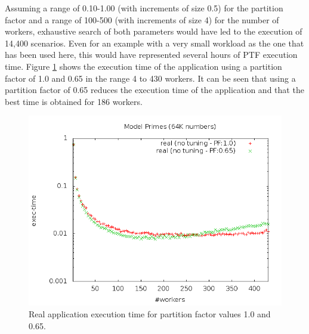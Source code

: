 Assuming a range of 0.10-1.00 (with increments of size 0.5) for the partition factor and a range of 100-500 (with increments of size 4) for the number of workers, exhaustive search of both parameters would have led to the execution of 14,400 scenarios. Even for an example with a very small workload as the one that has been used here, this would have represented several hours of PTF execution time. Figure \ref{fig:MWprimes-exhaustive} shows the execution time of the application using a partition factor of 1.0 and 0.65 in the range 4 to 430 workers. It can be seen that using a partition factor of 0.65 reduces the execution time of the application and that the best time is obtained for 186 workers.

\begin{figure}[bt]
  \center
  \includegraphics[width=0.55\paperwidth]{../BPG/images/MWfeatures-model.png}
	\caption{Real application execution time for partition factor values 1.0 and 0.65.}
	\label{fig:MWprimes-exhaustive}
\end{figure}

